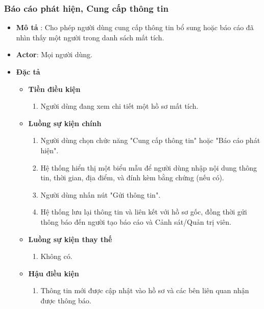 \documentclass[../DoAn.tex]{subfiles}
\begin{document}
\subsubsection{Báo cáo phát hiện, Cung cấp thông tin}
\begin{itemize}
	\item \textbf{Mô tả} : Cho phép người dùng cung cấp thông tin bổ sung hoặc báo cáo đã nhìn thấy một người trong danh sách mất tích.
	\item \textbf{Actor}: Mọi người dùng.
	\item \textbf{Đặc tả}
	      \begin{itemize}
		      \item \textbf{Tiền điều kiện}
		            \begin{enumerate}
			            \item Người dùng đang xem chi tiết một hồ sơ mất tích.
		            \end{enumerate}
		      \item \textbf{Luồng sự kiện chính}
		            \begin{enumerate}
			            \item Người dùng chọn chức năng "Cung cấp thông tin" hoặc "Báo cáo phát hiện".
			            \item Hệ thống hiển thị một biểu mẫu để người dùng nhập nội dung thông tin, thời gian, địa điểm, và đính kèm bằng chứng (nếu có).
			            \item Người dùng nhấn nút "Gửi thông tin".
			            \item Hệ thống lưu lại thông tin và liên kết với hồ sơ gốc, đồng thời gửi thông báo đến người tạo báo cáo và Cảnh sát/Quản trị viên.
		            \end{enumerate}
		      \item \textbf{Luồng sự kiện thay thế}
		            \begin{enumerate}
			            \item Không có.
		            \end{enumerate}
		      \item \textbf{Hậu điều kiện}
		            \begin{enumerate}
			            \item Thông tin mới được cập nhật vào hồ sơ và các bên liên quan nhận được thông báo.
		            \end{enumerate}
	      \end{itemize}
\end{itemize}
\end{document}
